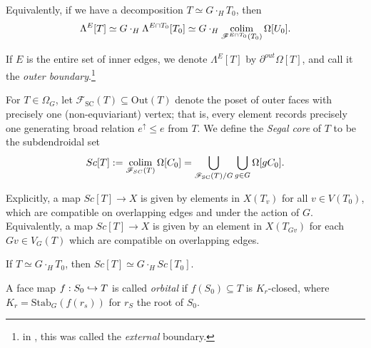 \documentclass[a4paper,10pt,draft]{article}%
\begin{document}
\begin{remark}
      Equivalently, if we have a decomposition $T \simeq G \cdot_H T_0$, then
      \begin{equation}
            \Lambda^{E}[T] \simeq G \cdot_H \Lambda^{E \cap T_0}[T_0]
            \simeq G \cdot_H \mathop{\operatorname{colim}}\limits_{\mathscr{F}^{E \cap T_0}(T_0)}\Omega[U_0].
      \end{equation}
\end{remark}

\begin{remark}
      If $E$ is the entire set of inner edges, we denote $\Lambda^{E}[T]$ by $\partial^{out}\Omega[T]$,
      and call it the \textit{outer boundary}.\footnote{
        in \cite{CM13a}, this was called the \textit{external} boundary.}
\end{remark}

\begin{definition}
      For $T \in \Omega_G$, let $\mathscr{F}_{\mathrm{SC}}(T) \subseteq \mathrm{Out}(T)$ denote the poset of outer faces
      with precisely one (non-equviariant) vertex;
      that is, every element records precisely one generating broad relation
      $e^\uparrow \leq e$ from $T$.
      We define the \textit{Segal core} of $T$ to be the subdendroidal set
      \begin{equation}
            Sc[T] :=
            \mathop{\operatorname{colim}}\limits_{\mathscr{F}_{SC}(T)} \Omega[C_0]
            = \mathop{\bigcup}\limits_{\mathscr{F}_{\mathrm{SC}}(T)/G}\mathop{\bigcup}\limits_{g \in G}\Omega[g C_0].
      \end{equation}
\end{definition}

\begin{remark}
      Explicitly, a map $Sc[T] \to X$ is given by elements in
      $X(T_v)$
      for all $v \in V(T_0)$,
      which are compatible on overlapping edges and under the action of $G$.
      Equivalently, a map $Sc[T] \to X$ is given by an element in $X(T_{G v})$ for each $G v \in V_G(T)$
      which are compatible on overlapping edges.
\end{remark}

\begin{remark}
      If $T \simeq G \cdot_H T_0$, then
      $Sc[T] \simeq G \cdot_H Sc[T_0]$.
\end{remark}


\begin{definition}
      A face map $f:S_0 \hookrightarrow T$ is called \textit{orbital} if
      $f(S_0) \subseteq T$ is $K_r$-closed, where $K_r = \mathrm{Stab}_G(f(r_s))$ for $r_S$ the root of $S_0$.
\end{definition}
\end{document}
